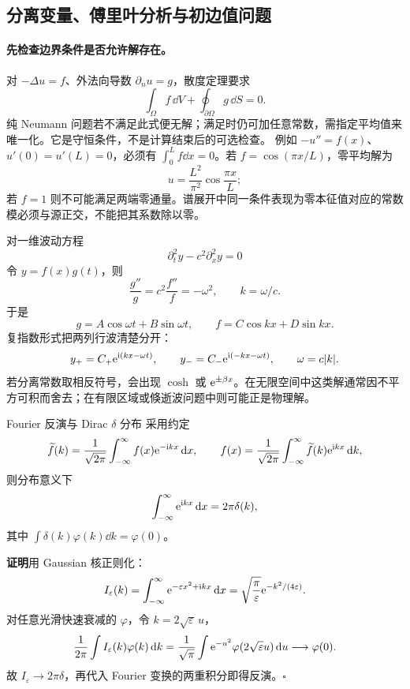 \subsection{分离变量、傅里叶分析与初边值问题}

\paragraph{先检查边界条件是否允许解存在。}
对 $-\Delta u=f$、外法向导数 $\partial_nu=g$，散度定理要求
\[
 \int_\Omega f\,\dd V+\oint_{\partial\Omega}g\,\dd S=0.
\]
纯 Neumann 问题若不满足此式便无解；满足时仍可加任意常数，需指定平均值来唯一化。它是守恒条件，不是计算结束后的可选检查。
例如 $-u''=f(x)$、$u'(0)=u'(L)=0$，必须有 $\int_0^L f\dd x=0$。若 $f=\cos(\pi x/L)$，零平均解为
\[
 u=\frac{L^2}{\pi^2}\cos\frac{\pi x}{L};
\]
若 $f=1$ 则不可能满足两端零通量。谱展开中同一条件表现为零本征值对应的常数模必须与源正交，不能把其系数除以零。


对一维波动方程
\[
 \partial_t^2y-c^2\partial_x^2y=0
\]
令 $y=f(x)g(t)$，则
\[
 \frac{g''}{g}=c^2\frac{f''}{f}=-\omega^2,\qquad k=\omega/c.
\]
于是
\[
 g=A\cos\omega t+B\sin\omega t,\qquad
 f=C\cos kx+D\sin kx.
\]
复指数形式把两列行波清楚分开：
\[
 y_+=C_+\mathrm e^{\mathrm i(kx-\omega t)},\qquad
 y_-=C_-\mathrm e^{\mathrm i(-kx-\omega t)},\qquad \omega=c|k|.
\]
若分离常数取相反符号，会出现 $\cosh$ 或 $\mathrm e^{\pm\beta x}$。在无限空间中这类解通常因不平方可积而舍去；在有限区域或倏逝波问题中则可能正是物理解。

\begin{advtheorem}{Fourier 反演与 Dirac $\delta$ 分布}\label{advA3:thm:fourier-inversion}
采用约定
\[
 \widetilde f(k)=\frac1{\sqrt{2\pi}}\int_{-\infty}^{\infty}f(x)\mathrm e^{-\mathrm i kx}\mathop{}\!\mathrm d x,\qquad
 f(x)=\frac1{\sqrt{2\pi}}\int_{-\infty}^{\infty}\widetilde f(k)\mathrm e^{\mathrm i kx}\mathop{}\!\mathrm d k,
\]
则分布意义下
\[
 \int_{-\infty}^{\infty}\mathrm e^{\mathrm i kx}\mathop{}\!\mathrm d x=2\pi\delta(k),
\]
其中 $\int\delta(k)\varphi(k)\dd k=\varphi(0)$。
\end{advtheorem}
\noindent\textbf{证明}\quad 用 Gaussian 核正则化：
\[
 I_\varepsilon(k)=\int_{-\infty}^{\infty}
 \mathrm e^{-\varepsilon x^2+\mathrm i kx}\mathop{}\!\mathrm d x
 =\sqrt{\frac\pi\varepsilon}\mathrm e^{-k^2/(4\varepsilon)}.
\]
对任意光滑快速衰减的 $\varphi$，令 $k=2\sqrt{\varepsilon}\,u$，
\[
 \frac1{2\pi}\int I_\varepsilon(k)\varphi(k)\mathop{}\!\mathrm d k
 =\frac1{\sqrt\pi}\int\mathrm e^{-u^2}\varphi(2\sqrt\varepsilon u)\mathop{}\!\mathrm d u
 \longrightarrow\varphi(0).
\]
故 $I_\varepsilon\to2\pi\delta$，再代入 Fourier 变换的两重积分即得反演。\hfill$\square$

